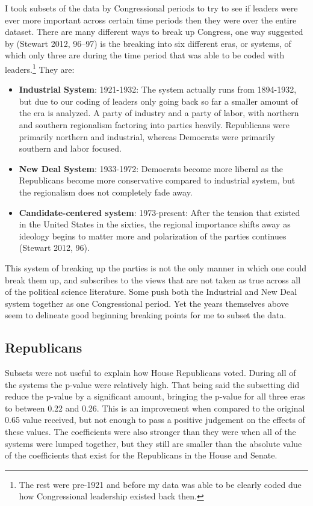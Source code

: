 \documentclass[12pt,twoside]{reedthesis}
\begin{document}
  I took subsets of the data by Congressional periods to try to see if
  leaders were ever more important across certain time periods then they
  were over the entire dataset. There are many different ways to break up
  Congress, one way suggested by (Stewart 2012, 96--97) is the breaking
  into six different eras, or systems, of which only three are during the
  time period that was able to be coded with
  leaders.\footnote{The rest were pre-1921 and before my data was able to be clearly coded due how Congressional leadership existed back then.}
  They are:
  
  \begin{itemize}
  \itemsep1pt\parskip0pt
  \item
    \textbf{Industrial System}: 1921-1932: The system actually runs from
    1894-1932, but due to our coding of leaders only going back so far a
    smaller amount of the era is analyzed. A party of industry and a party
    of labor, with northern and southern regionalism factoring into
    parties heavily. Republicans were primarily northern and industrial,
    whereas Democrats were primarily southern and labor focused.
  \item
    \textbf{New Deal System}: 1933-1972: Democrats become more liberal as
    the Republicans become more conservative compared to industrial
    system, but the regionalism does not completely fade away.
  \item
    \textbf{Candidate-centered system}: 1973-present: After the tension
    that existed in the United States in the sixties, the regional
    importance shifts away as ideology begins to matter more and
    polarization of the parties continues (Stewart 2012, 96).
  \end{itemize}
  
  This system of breaking up the parties is not the only manner in which
  one could break them up, and subscribes to the views that are not taken
  as true across all of the political science literature. Some push both
  the Industrial and New Deal system together as one Congressional period.
  Yet the years themselves above seem to delineate good beginning breaking
  points for me to subset the data.
  
  \subsection{Republicans}\label{republicans-1}
  
  Subsets were not useful to explain how House Republicans voted. During
  all of the systems the p-value were relatively high. That being said the
  subsetting did reduce the p-value by a significant amount, bringing the
  p-value for all three eras to between 0.22 and 0.26. This is an
  improvement when compared to the original 0.65 value received, but not
  enough to pass a positive judgement on the effects of these values. The
  coefficients were also stronger than they were when all of the systems
  were lumped together, but they still are smaller than the absolute value
  of the coefficients that exist for the Republicans in the House and
  Senate.
  
\end{document}
